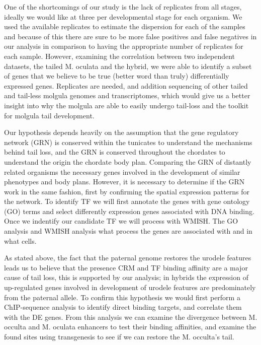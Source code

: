 One of the shortcomings of our study is the lack of replicates from all stages, ideally we would like at three per developmental stage for each organism. We used the available replicates to estimate the dispersion for each of the samples and because of this there are sure to be more false positives and false negatives in our analysis in comparison to having the appropriate number of replicates for each sample. However, examining the correlation between two independent datasets, the tailed M. oculata and the hybrid, we were able to identify a subset of genes that we believe to be true (better word than truly) differentially expressed genes. Replicates are needed, and addition sequencing of other tailed and tail-less molgula genomes and transcriptomes, which would give us a better insight into why the molgula are able to easily undergo tail-loss and the toolkit for molgula tail development. 

Our hypothesis depends heavily on the assumption that the gene regulatory network (GRN) is conserved within the tunicates to understand the mechanisms behind tail loss, and the GRN is conserved throughout the chordates to understand the origin the chordate body plan. Comparing the GRN of distantly related organisms the necessary genes involved in the development of similar phenotypes and body plans. However, it is necessary to determine if the GRN work in the same fashion, first by confirming the spatial expression patterns for the network. To identify TF we will first annotate the genes with gene ontology (GO) terms and select differently expression genes associated with DNA binding. Once we indentify our candidate TF we will process with WMISH. The GO analysis and WMISH analysis what process the genes are associated with and in what cells. 

As stated above, the fact that the paternal genome restores the urodele features leads us to believe that the presence CRM and TF binding affinity are a major cause of tail loss, this is supported by our analysis; in hybrids the expression of up-regulated genes involved in development of urodele features are predominately from the paternal allele. To confirm this hypothesis we would first perform a ChIP-sequence analysis to identify direct binding targets, and correlate them with the DE genes. From this analysis we can examine the divergence between M. occulta and M. oculata enhancers to test their binding affinities, and examine the found sites using transgenesis to see if we can restore the M. occulta's tail.

